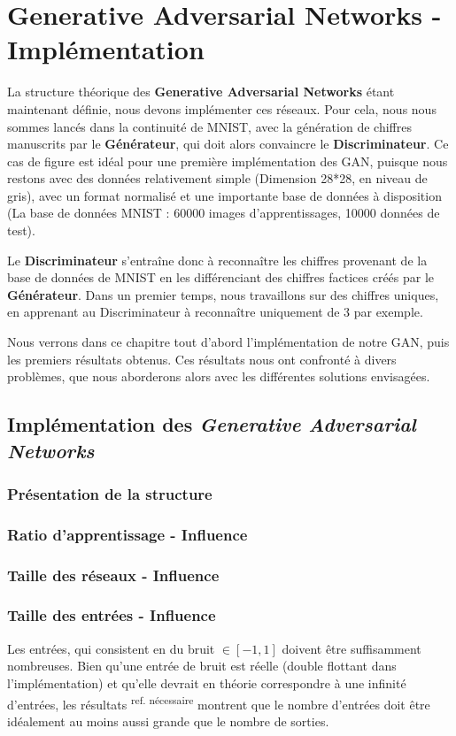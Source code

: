 \chapter{Generative Adversarial Networks - Implémentation}

 La structure théorique des \textbf{Generative Adversarial Networks} étant maintenant définie, nous devons implémenter ces réseaux. Pour cela, nous nous sommes lancés dans la continuité de MNIST, avec la génération de chiffres manuscrits par le \textbf{Générateur}, qui doit alors convaincre le \textbf{Discriminateur}. Ce cas de figure est idéal pour une première implémentation des GAN, puisque nous restons avec des données relativement simple (Dimension 28*28, en niveau de gris), avec un format normalisé et une importante base de données à disposition (La base de données MNIST : 60000 images d'apprentissages, 10000 données de test).

Le \textbf{Discriminateur} s’entraîne donc à reconnaître les chiffres provenant de la base de données de MNIST en les différenciant des chiffres factices créés par le \textbf{Générateur}. Dans un premier temps, nous travaillons sur des chiffres uniques, en apprenant au Discriminateur à reconnaître uniquement de 3 par exemple.

Nous verrons dans ce chapitre tout d'abord l'implémentation de notre GAN, puis les premiers résultats obtenus. Ces résultats nous ont confronté à divers problèmes, que nous aborderons alors avec les différentes solutions envisagées.


\section{Implémentation des \textit{Generative Adversarial Networks}}
\subsection{Présentation de la structure}
\subsection{Ratio d'apprentissage - Influence}
\subsection{Taille des réseaux - Influence}
\subsection{Taille des entrées - Influence}
Les entrées, qui consistent en du bruit $\in [-1,1]$ doivent être suffisamment nombreuses. Bien qu'une entrée de bruit est réelle (double flottant dans l'implémentation) et qu'elle devrait en théorie correspondre à une infinité d'entrées, les résultats \textsuperscript{ref. nécessaire} montrent que le nombre d'entrées doit être idéalement au moins aussi grande que le nombre de sorties.

